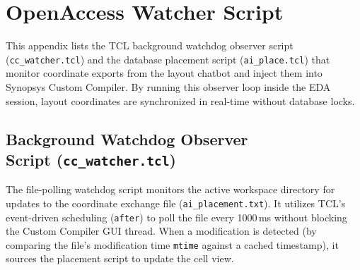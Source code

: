 
\chapter{OpenAccess Watcher Script}
\label{app:tcl_scripts}

\noindent
This appendix lists the TCL background watchdog observer script (\texttt{cc\_}\allowbreak\texttt{watcher.tcl}) and the database placement script (\texttt{ai\_}\allowbreak\texttt{place.tcl}) that monitor coordinate exports from the layout chatbot and inject them into Synopsys Custom Compiler. By running this observer loop inside the EDA session, layout coordinates are synchronized in real-time without database locks.

\section[Watchdog Observer Script (cc\_watcher.tcl)]{Background Watchdog Observer\\Script (\texttt{cc\_}\allowbreak\texttt{watcher.tcl})}
\noindent
The file-polling watchdog script monitors the active workspace directory for updates to the coordinate exchange file (\texttt{ai\_placement.txt}). It utilizes TCL's event-driven scheduling (\texttt{after}) to poll the file every 1000\,ms without blocking the Custom Compiler GUI thread. When a modification is detected (by comparing the file's modification time \texttt{mtime} against a cached timestamp), it sources the placement script to update the cell view.

